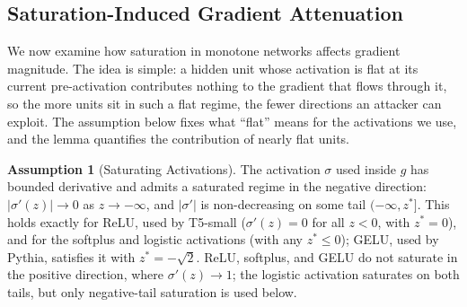 \documentclass{article}
\theoremstyle{plain}
\theoremstyle{definition}
\newtheorem{assumption}[theorem]{Assumption}
\theoremstyle{remark}
\begin{document}
\subsection{Saturation-Induced Gradient Attenuation}
We now examine how saturation in monotone networks affects gradient magnitude. The idea is simple: a hidden unit whose activation is flat at its current pre-activation contributes nothing to the gradient that flows through it, so the more units sit in such a flat regime, the fewer directions an attacker can exploit. The assumption below fixes what ``flat'' means for the activations we use, and the lemma quantifies the contribution of nearly flat units.
\begin{assumption}[Saturating Activations]
\label{ass:saturation}
The activation $\sigma$ used inside $g$ has bounded derivative and admits a
saturated regime in the negative direction: $|\sigma'(z)| \to 0$ as $z\to -\infty$,
and $|\sigma'|$ is non-decreasing on some tail $(-\infty, z^\ast]$. This holds exactly
for ReLU, used by T5-small ($\sigma'(z) = 0$ for all $z < 0$, with $z^\ast = 0$), and
for the softplus and logistic activations (with any $z^\ast \le 0$); GELU, used by Pythia,
satisfies it with $z^\ast = -\sqrt{2}$. ReLU, softplus, and GELU do not saturate in the positive direction, where
$\sigma'(z) \to 1$; the logistic activation saturates on both tails, but only
negative-tail saturation is used below.
\end{assumption}


\end{document}
